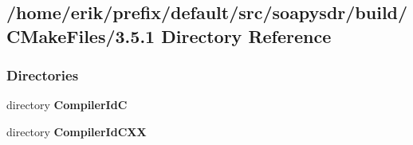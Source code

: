\subsection{/home/erik/prefix/default/src/soapysdr/build/\+C\+Make\+Files/3.5.1 Directory Reference}
\label{dir_9ee264640ebd9f919d56b2e1819d8046}
\subsubsection*{Directories}
\begin{DoxyCompactItemize}
\item 
directory {\bf Compiler\+IdC}
\item 
directory {\bf Compiler\+Id\+C\+XX}
\end{DoxyCompactItemize}
